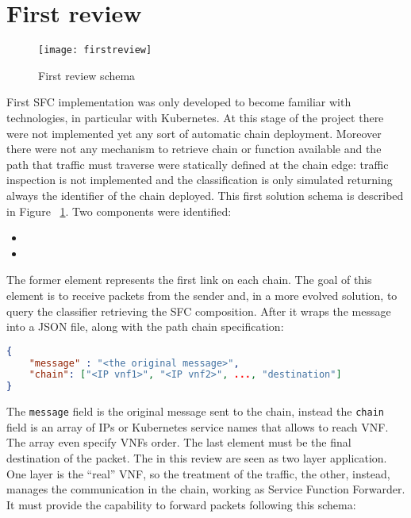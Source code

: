 \section{First review}
\begin{figure}
  \centering
  \texttt{[image: firstreview]}
  \caption{First review schema}
  \label{chap:impl:img:firstreview}
\end{figure}
First SFC implementation was only developed to become familiar with
technologies, in particular with Kubernetes. At this stage of the project there
were not implemented yet any sort of automatic chain deployment. Moreover
there were not any mechanism to retrieve chain or function available and the
path that traffic must traverse were statically defined at the chain edge:
traffic inspection is not implemented and the classification is only simulated
returning always the identifier of the chain deployed. This first solution
schema is described in Figure~ \ref{chap:impl:img:firstreview}. Two components
were identified: \begin{itemize} \item \enchainer
  \item \vnfs
\end{itemize}
The former element represents the first link on each chain. The goal of this
element is to receive packets from the sender and, in a more evolved solution,
to query the classifier retrieving the SFC composition. After it wraps the
message into a JSON file, along with the path chain specification:
\begin{lstlisting}[language=json]
{
    "message" : "<the original message>",
    "chain": ["<IP vnf1>", "<IP vnf2>", ..., "destination"]
}
\end{lstlisting}
The \texttt{message} field is the original message sent to the chain,
instead the \texttt{chain} field is an array of IPs or Kubernetes service names
that allows to reach VNF. The array even specify VNFs order. The last element
must be the final destination of the packet. 
The \vnf{} in this review are seen as two layer application. One layer is
the ``real'' VNF, so the treatment of the traffic, the other, instead, manages
the communication in the chain, working as Service Function Forwarder. It must
provide the capability to forward packets following this schema:
